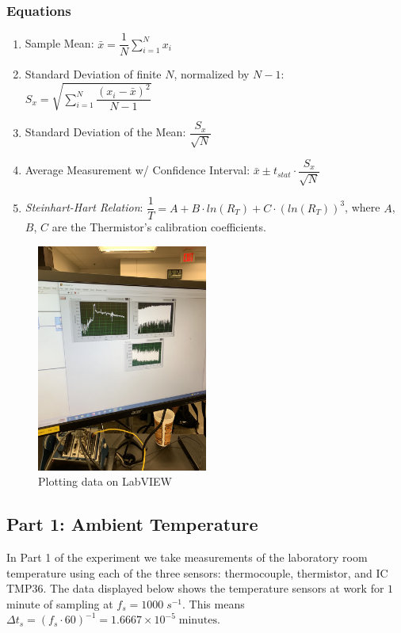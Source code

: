 \documentclass{article}
\begin{document}
\subsubsection*{Equations}
\begin{enumerate}[label = \Roman*.]
    \item Sample Mean: \(\bar{x} = \dfrac{1}{N}\displaystyle\sum_{i=1}^{N} x_{i}\) 
    \item Standard Deviation of finite $N$, normalized by $N-1$: \(S_{x} = \sqrt{\displaystyle\sum_{i=1}^{N} \dfrac{(x_{i} - \bar{x})^{2}}{N-1}}\)
    \item Standard Deviation of the Mean: \(\dfrac{S_{x}}{\sqrt{N}}\)
    \item Average Measurement w/ Confidence Interval: \(\bar{x} \pm t_{stat}\cdot \dfrac{S_{x}}{\sqrt{N}}\)
    \item \textit{Steinhart-Hart Relation}: \(\dfrac{1}{T} = A + B\cdot ln(R_{T}) + C\cdot (ln(R_{T}))^{3}\), where $A$, $B$, $C$ are the Thermistor's calibration coefficients.
\end{enumerate}
 
\begin{figure}[H]
\centering
\includegraphics[width=0.5\textwidth, angle = -90]{lab2images/labview_plots.jpg}
\caption{Plotting data on LabVIEW}
\end{figure}

\subsection{Part 1: Ambient Temperature}
In Part 1 of the experiment we take measurements of the laboratory room temperature using each of the three sensors: thermocouple, thermistor, and IC TMP36. The data displayed below shows the temperature sensors at work for $1$ minute of sampling at $f_{s} = 1000\; s^{-1}$. This means $\Delta t_{s} = (f_{s}\cdot 60)^{-1} = 1.6667\times10^{-5}\; \text{minutes}$.
\end{document}
